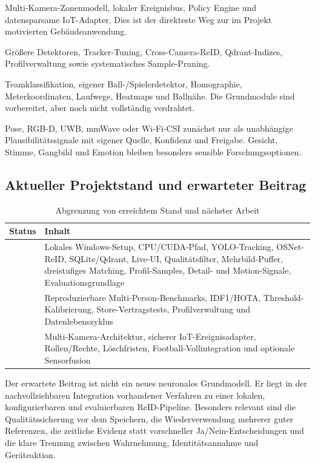 \begin{description}[style=nextline,leftmargin=8mm]
  \item[Weg A -- Smart Home und Assistenz]
    Multi-Kamera-Zonenmodell, lokaler Ereignisbus, Policy Engine und
    datensparsame IoT-Adapter. Dies ist der direkteste Weg zur im Projekt
    motivierten Gebäudeanwendung.
  \item[Weg B -- Genauigkeit und Skalierung]
    Größere Detektoren, Tracker-Tuning, Cross-Camera-ReID, Qdrant-Indizes,
    Profilverwaltung sowie systematisches Sample-Pruning.
  \item[Weg C -- Sportanalyse]
    Teamklassifikation, eigener Ball-/Spielerdetektor, Homographie,
    Meterkoordinaten, Laufwege, Heatmaps und Ballnähe. Die Grundmodule sind
    vorbereitet, aber noch nicht vollständig verdrahtet.
  \item[Weg D -- optionale Sensorfusion]
    Pose, RGB-D, UWB, mmWave oder Wi-Fi-CSI zunächst nur als unabhängige
    Plausibilitätssignale mit eigener Quelle, Konfidenz und Freigabe. Gesicht,
    Stimme, Gangbild und Emotion bleiben besonders sensible Forschungsoptionen.
\end{description}

\subsection{Aktueller Projektstand und erwarteter Beitrag}

\begin{table}[H]
  \centering
  \caption{Abgrenzung von erreichtem Stand und nächster Arbeit}
  \label{tab:status}
  \begin{tabularx}{\textwidth}{L{27mm}Y}
    \toprule
    \textbf{Status} & \textbf{Inhalt} \\
    \midrule
     & Lokales Windows-Setup, CPU/CUDA-Pfad, YOLO-Tracking, OSNet-ReID, SQLite/Qdrant, Live-UI, Qualitätsfilter, Mehrbild-Puffer, dreistufiges Matching, Profil-Samples, Detail- und Motion-Signale, Evaluationsgrundlage \\
     & Reproduzierbare Multi-Person-Benchmarks, IDF1/HOTA, Threshold-Kalibrierung, Store-Vertragstests, Profilverwaltung und Datenlebenszyklus \\
     & Multi-Kamera-Architektur, sicherer IoT-Ereignisadapter, Rollen/Rechte, Löschfristen, Football-Vollintegration und optionale Sensorfusion \\
    \bottomrule
  \end{tabularx}
\end{table}

Der erwartete Beitrag ist nicht ein neues neuronales Grundmodell. Er liegt in
der nachvollziehbaren Integration vorhandener Verfahren zu einer lokalen,
konfigurierbaren und evaluierbaren ReID-Pipeline. Besonders relevant sind die
Qualitätssicherung vor dem Speichern, die Wiederverwendung mehrerer guter
Referenzen, die zeitliche Evidenz statt vorschneller Ja/Nein-Entscheidungen und
die klare Trennung zwischen Wahrnehmung, Identitätsannahme und Geräteaktion.

